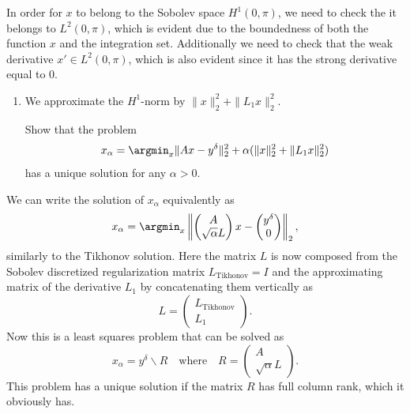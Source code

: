 \nopagebreak
\noindent\hrulefill

In order for \(x\) to belong to the Sobolev space \(H^{1}\left(0,\pi  \right)\), we need to check the it belongs to
    \(L^2(0,\pi)\), which is evident due to the boundedness of both the function \(x\) and the integration set. 
Additionally we need to check that the weak derivative \(x' \in L^2(0, \pi)\), which is also evident since it has the
    strong derivative equal to \(0\).

\nopagebreak
\noindent\hrulefill


\begin{enumerate}[resume, label = (\alph*)]
    \item We approximate the $H^1$-norm by $\|x\|^2_2 + \|L_1x\|^2_2$. 

    Show that the problem
        \begin{equation}
            \label{eq:abel-tikhonov}
            x_\alpha = \argmin_x \|Ax-y^\delta\|^2_2 + \alpha(\|x\|^2_2 + \|L_1x\|^2_2)
        \end{equation}
    has a unique solution for any $\alpha > 0$.
\end{enumerate}

\nopagebreak
\noindent\hrulefill

We can write the solution of \(x_\alpha\) equivalently as \[
    x_\alpha = \argmin_x \left\| \begin{pmatrix}
        A \\ \sqrt{\alpha} L 
    \end{pmatrix} x - \begin{pmatrix}
        y^\delta \\ 0
    \end{pmatrix} \right\|_2,
\]  similarly to the Tikhonov solution.
Here the matrix \(L\) is now composed from the Sobolev discretized regularization matrix \( L_\text{Tikhonov} = I \)
and the approximating matrix of the derivative \(L_1\) by concatenating them vertically as \[
    L = \begin{pmatrix}
        L_\text{Tikhonov} \\ L_1
    \end{pmatrix}.
\] 
Now this is a least squares problem that can be solved as \[
    x_\alpha = y^{\delta} \backslash R \quad \text{where} \quad R = \begin{pmatrix}
        A \\ \sqrt{\alpha}L
    \end{pmatrix}.
\] 
This problem has a unique solution if the matrix \(R\) has full column rank, which it obviously has.

